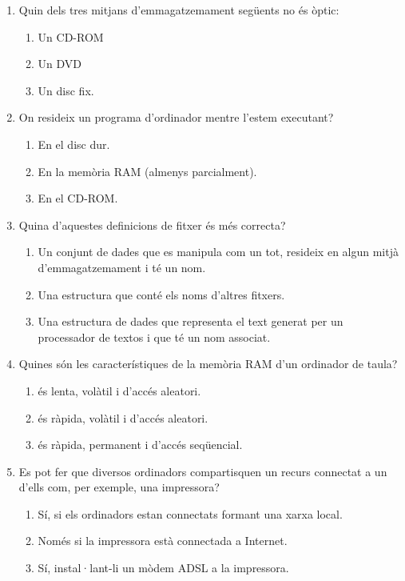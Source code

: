 \begin{enumerate}
\item Quin dels tres mitjans d'emmagatzemament següents no és òptic:
  \begin{enumerate}
  \item Un CD-ROM
  \item Un DVD
  \item Un disc fix.
  \end{enumerate}

\item On resideix un programa d'ordinador mentre l'estem executant?
  \begin{enumerate}
  \item En el disc dur.
  \item En la memòria RAM (almenys parcialment).
  \item En el CD-ROM.
  \end{enumerate} 

\item Quina d'aquestes definicions de fitxer és més correcta?
  \begin{enumerate}
  \item Un conjunt de dades que es manipula com un tot, resideix en
    algun mitjà d'emmagatzemament i té un nom.
  \item Una estructura que conté els noms d'altres fitxers.
  \item Una estructura de dades que representa el text generat per un
    processador de textos i que té un nom associat.
  \end{enumerate} 

\item Quines són les característiques de la memòria RAM d'un ordinador
  de taula?
  \begin{enumerate}
  \item és lenta, volàtil i d'accés aleatori.
  \item és ràpida, volàtil i d'accés aleatori.
  \item és ràpida, permanent i d'accés seqüencial.
  \end{enumerate}

\item Es pot fer que diversos ordinadors compartisquen un recurs
  connectat a un d'ells com, per exemple, una impressora?
  \begin{enumerate}
  \item Sí, si els ordinadors estan connectats formant una xarxa local.
  \item Només si la impressora està connectada a Internet.
  \item Sí, instal·lant-li un mòdem ADSL a la impressora.
  \end{enumerate} 


\end{enumerate}
